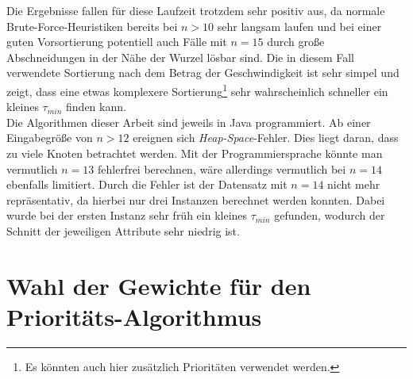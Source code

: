 \documentclass[german,version-2019-11]{uzl-thesis}
\begin{document}
Die Ergebnisse fallen für diese Laufzeit trotzdem sehr positiv aus, da normale Brute-Force-Heuristiken bereits bei $n>10$ sehr langsam laufen und bei einer guten Vorsortierung potentiell auch Fälle mit $n=15$ durch große Abschneidungen in der Nähe der Wurzel lösbar sind. Die in diesem Fall verwendete Sortierung nach dem Betrag der Geschwindigkeit ist sehr simpel und zeigt, dass eine etwas komplexere Sortierung\footnote{Es könnten auch hier zusätzlich Prioritäten verwendet werden.} sehr wahrscheinlich schneller ein kleines $\tau_{min}$ finden kann. \\
Die Algorithmen dieser Arbeit sind jeweils in Java programmiert. Ab einer Eingabegröße von $n>12$ ereignen sich \emph{Heap-Space}-Fehler. Dies liegt daran, dass zu viele Knoten betrachtet werden. Mit der Programmiersprache könnte man vermutlich $n=13$ fehlerfrei berechnen, wäre allerdings vermutlich bei $n=14$ ebenfalls limitiert. Durch die Fehler ist der Datensatz mit $n=14$ nicht mehr repräsentativ, da hierbei nur drei Instanzen berechnet werden konnten. Dabei wurde bei der ersten Instanz sehr früh ein kleines $\tau_{min}$ gefunden, wodurch der Schnitt der jeweiligen Attribute sehr niedrig ist.   

\section{Wahl der Gewichte für den Prioritäts-Algorithmus}
\end{document}
